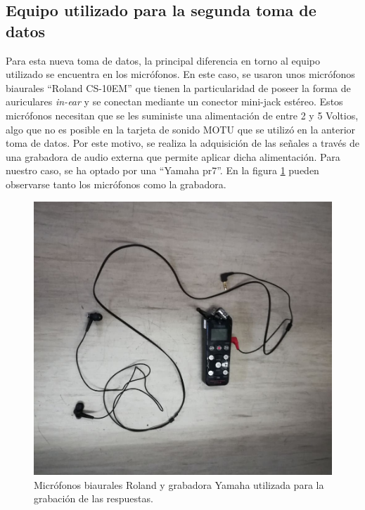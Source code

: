 \documentclass[11pt,a4paper,twoside]{book}
\begin{document}
                
        \subsection{Equipo utilizado para la segunda toma de datos}
            Para esta nueva toma de datos, la principal diferencia en torno al equipo utilizado se encuentra en los micrófonos. En este caso, se usaron unos micrófonos biaurales ``Roland CS-10EM'' que tienen la particularidad de poseer la forma de auriculares \textit{in-ear} y se conectan mediante un conector mini-jack estéreo. Estos micrófonos necesitan que se les suministe una alimentación de entre 2 y 5 Voltios, algo que no es posible en la tarjeta de sonido MOTU que se utilizó en la anterior toma de datos. Por este motivo, se realiza la adquisición de las señales a través de una grabadora de audio externa que permite aplicar dicha alimentación. Para nuestro caso, se ha optado por una ``Yamaha pr7''. En la figura \ref{fig:microsBi} pueden observarse tanto los micrófonos como la grabadora.
                
            \begin{figure}[H]
                \includegraphics[scale=0.3]{../imagenes/MicroBi.jpg}
                \centering
                \caption{Micrófonos biaurales Roland y grabadora Yamaha utilizada para la grabación de las respuestas.}
                \label{fig:microsBi}
            \end{figure}
                
\end{document}
